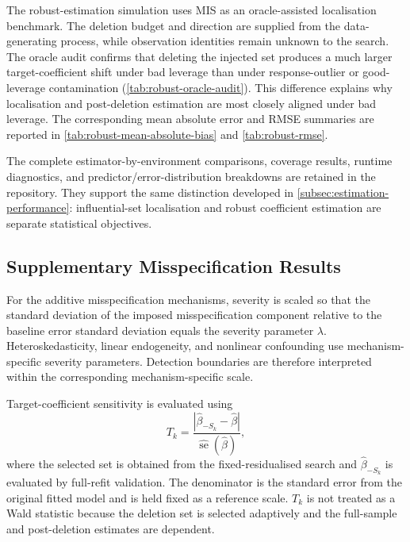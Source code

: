 \documentclass[../main.tex]{subfiles}
\begin{document}
The robust-estimation simulation uses MIS as an oracle-assisted localisation benchmark. The deletion budget and direction are supplied from the data-generating process, while observation identities remain unknown to the search. The oracle audit confirms that deleting the injected set produces a much larger target-coefficient shift under bad leverage than under response-outlier or good-leverage contamination (\autoref{tab:robust-oracle-audit}). This difference explains why localisation and post-deletion estimation are most closely aligned under bad leverage. The corresponding mean absolute error and RMSE summaries are reported in \autoref{tab:robust-mean-absolute-bias} and \autoref{tab:robust-rmse}.







The complete estimator-by-environment comparisons, coverage results, runtime diagnostics, and predictor/error-distribution breakdowns are retained in the repository. They support the same distinction developed in \autoref{subsec:estimation-performance}: influential-set localisation and robust coefficient estimation are separate statistical objectives.







\FloatBarrier
\subsection{Supplementary Misspecification Results}
\label{app:misspec-definitions}

For the additive misspecification mechanisms, severity is scaled so that the standard deviation of the imposed misspecification component relative to the baseline error standard deviation equals the severity parameter \(\lambda\). Heteroskedasticity, linear endogeneity, and nonlinear confounding use mechanism-specific severity parameters. Detection boundaries are therefore interpreted within the corresponding mechanism-specific scale.

Target-coefficient sensitivity is evaluated using
\[
T_k
=
\frac{
\left|
\widehat{\beta}_{-S_k}-\widehat{\beta}
\right|
}{
\widehat{\operatorname{se}}(\widehat{\beta})
},
\]
where the selected set is obtained from the fixed-residualised search and \(\widehat{\beta}_{-S_k}\) is evaluated by full-refit validation. The denominator is the standard error from the original fitted model and is held fixed as a reference scale. \(T_k\) is not treated as a Wald statistic because the deletion set is selected adaptively and the full-sample and post-deletion estimates are dependent.
\end{document}

